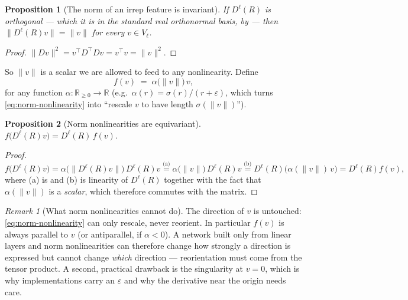 \documentclass[11pt,a4paper]{report}
\newtheorem{proposition}[proposition]{Proposition}
\theoremstyle{definition}
\theoremstyle{remark}
\newtheorem{remark}[remark]{Remark}
\newcommand{\RR}{\mathbb R}
\begin{document}
\begin{proposition}[The norm of an irrep feature is invariant]
\label{prop:norm-invariant}
If $D^\ell(R)$ is orthogonal --- which it is in the standard real
orthonormal basis, by  --- then
$\|D^\ell(R)v\| = \|v\|$ for every $v\in V_\ell$.
\end{proposition}

\begin{proof}
$\|D v\|^2 = v^\top D^\top D v = v^\top v = \|v\|^2$.
\end{proof}

So $\|v\|$ is a scalar we are allowed to feed to any nonlinearity. Define
\begin{equation}
\label{eq:norm-nonlinearity}
f(v) \;=\; \alpha\bigl(\|v\|\bigr)\,v ,
\end{equation}
for any function $\alpha:\RR_{\ge0}\to\RR$ (e.g.\
$\alpha(r)=\sigma(r)/(r+\varepsilon)$, which turns \eqref{eq:norm-nonlinearity}
into ``rescale $v$ to have length $\sigma(\|v\|)$'').

\begin{proposition}[Norm nonlinearities are equivariant]
\label{prop:norm-nonlin-equivariant}
$f\bigl(D^\ell(R)v\bigr) = D^\ell(R)\,f(v)$.
\end{proposition}

\begin{proof}
\[
f\bigl(D^\ell(R)v\bigr)
= \alpha\bigl(\|D^\ell(R)v\|\bigr)\,D^\ell(R)v
\overset{\text{(a)}}{=} \alpha\bigl(\|v\|\bigr)\,D^\ell(R)v
\overset{\text{(b)}}{=} D^\ell(R)\bigl(\alpha(\|v\|)\,v\bigr)
= D^\ell(R)f(v),
\]
where (a) is  and (b) is linearity of
$D^\ell(R)$ together with the fact that $\alpha(\|v\|)$ is a
\emph{scalar}, which therefore commutes with the matrix.
\end{proof}

\begin{remark}[What norm nonlinearities cannot do]
\label{rem:norm-nonlin-limits}
The direction of $v$ is untouched: \eqref{eq:norm-nonlinearity} can only
rescale, never reorient. In particular $f(v)$ is always parallel to $v$ (or
antiparallel, if $\alpha<0$). A network built only from linear layers and
norm nonlinearities can therefore change how strongly a direction is
expressed but cannot change \emph{which} direction --- reorientation must
come from the tensor product. A second, practical drawback is the
singularity at $v=0$, which is why implementations carry an $\varepsilon$
and why the derivative near the origin needs care.
\end{remark}
\end{document}
